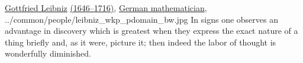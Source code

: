 \qboxnps
  {\href{http://en.wikipedia.org/wiki/Gottfried_Leibniz}{Gottfried Leibniz}
   \href{http://www-history.mcs.st-andrews.ac.uk/Timelines/TimelineC.html}{(1646--1716)},
   \href{http://www-history.mcs.st-andrews.ac.uk/BirthplaceMaps/Places/Germany.html}{German mathematician},
   \footnotemark
  }
  {../common/people/leibniz_wkp_pdomain_bw.jpg}
  {In signs one observes an advantage in discovery which is greatest when they express
   the exact nature of a thing briefly and, as it were, picture it;
   then indeed the labor of thought is wonderfully diminished.}



